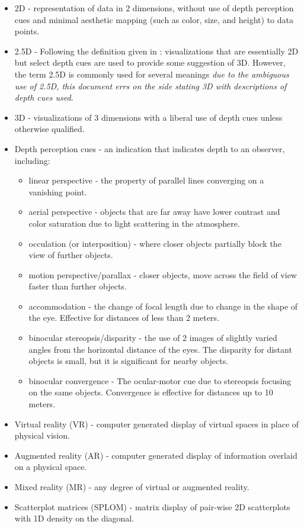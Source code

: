 \documentclass{monashthesis}
\begin{document}
\begin{itemize}
\tightlist
\item
  2D - representation of data in 2 dimensions, without use of depth
  perception cues and minimal aesthetic mapping (such as color, size,
  and height) to data points.
\item
  2.5D - Following the definition given in
  \textcite{ware_designing_2000}: visualizations that are essentially 2D
  but select depth cues are used to provide some suggestion of 3D.
  However, the term 2.5D is commonly used for several meanings \emph{due
  to the ambiguous use of 2.5D, this document errs on the side stating
  3D with descriptions of depth cues used}.
\item
  3D - visualizations of 3 dimensions with a liberal use of depth cues
  unless otherwise qualified.
\item
  Depth perception cues - an indication that indicates depth to an
  observer, including:

  \begin{itemize}
  \tightlist
  \item
    linear perspective - the property of parallel lines converging on a
    vanishing point.
  \item
    aerial perspective - objects that are far away have lower contrast
    and color saturation due to light scattering in the atmosphere.
  \item
    occulation (or interposition) - where closer objects partially block
    the view of further objects.
  \item
    motion perspective/parallax - closer objects, move across the field
    of view faster than further objects.
  \item
    accommodation - the change of focal length due to change in the
    shape of the eye. Effective for distances of less than 2 meters.
  \item
    binocular stereopsis/disparity - the use of 2 images of slightly
    varied angles from the horizontal distance of the eyes. The
    disparity for distant objects is small, but it is significant for
    nearby objects.
  \item
    binocular convergence - The ocular-motor cue due to stereopsis
    focusing on the same objects. Convergence is effective for distances
    up to 10 meters.
  \end{itemize}
\item
  Virtual reality (VR) - computer generated display of virtual spaces in
  place of physical vision.
\item
  Augmented reality (AR) - computer generated display of information
  overlaid on a physical space.
\item
  Mixed reality (MR) - any degree of virtual or augmented reality.
\item
  Scatterplot matrices (SPLOM) - matrix display of pair-wise 2D
  scatterplots with 1D density on the diagonal.
\end{itemize}
\end{document}
